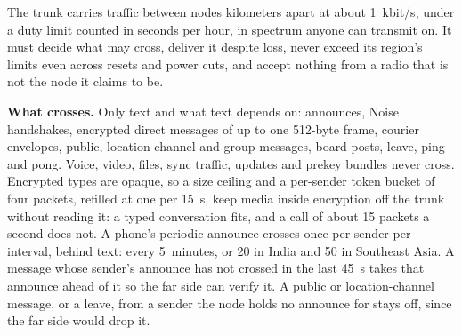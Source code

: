 \documentclass[conference]{IEEEtran}
\begin{document}
The trunk carries traffic between nodes kilometers apart at about 1~kbit/s, under a duty limit counted in seconds per hour, in spectrum anyone can transmit on. It must decide what may cross, deliver it despite loss, never exceed its region's limits even across resets and power cuts, and accept nothing from a radio that is not the node it claims to be.

\textbf{What crosses.} Only text and what text depends on: announces, Noise handshakes, encrypted direct messages of up to one 512-byte frame, courier envelopes, public, location-channel and group messages, board posts, leave, ping and pong. Voice, video, files, sync traffic, updates and prekey bundles never cross. Encrypted types are opaque, so a size ceiling and a per-sender token bucket of four packets, refilled at one per 15~s, keep media inside encryption off the trunk without reading it: a typed conversation fits, and a call of about 15 packets a second does not. A phone's periodic announce crosses once per sender per interval, behind text: every 5~minutes, or 20 in India and 50 in Southeast Asia. A message whose sender's announce has not crossed in the last 45~s takes that announce ahead of it so the far side can verify it. A public or location-channel message, or a leave, from a sender the node holds no announce for stays off, since the far side would drop it.
\end{document}
